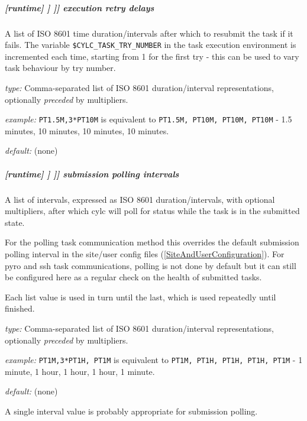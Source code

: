 \subparagraph[execution retry delays]{[runtime] \textrightarrow [[\_\_NAME\_\_]] \textrightarrow [[[job]]] \textrightarrow execution retry delays}
\label{RefRetries}

A list of ISO 8601 time duration/intervals after which to resubmit the task
if it fails. The variable \lstinline=$CYLC_TASK_TRY_NUMBER= in the task
execution environment is incremented each time, starting from 1 for the
first try - this can be used to vary task behaviour by try number.

\begin{myitemize}
    \item {\em type:} Comma-separated list of ISO 8601 duration/interval representations,
    optionally {\em preceded} by multipliers.
    \item {\em example:} \lstinline=PT1.5M,3*PT10M= is equivalent to
    \lstinline=PT1.5M, PT10M, PT10M, PT10M= - 1.5 minutes, 10 minutes,
    10 minutes, 10 minutes.
    \item {\em default:} (none)
\end{myitemize}

\subparagraph[submission polling intervals]{[runtime] \textrightarrow [[\_\_NAME\_\_]] \textrightarrow [[[job]]] \textrightarrow submission polling intervals}
\label{SubmissionPollingIntervals}

A list of intervals, expressed as ISO 8601 duration/intervals, with optional
multipliers, after which cylc will poll for status while the task is in the
submitted state.

For the polling task communication method this overrides the default
submission polling interval in the site/user config files
(\ref{SiteAndUserConfiguration}). For pyro and ssh task communications,
polling is not done by default but it can still be configured here as a
regular check on the health of submitted tasks.

Each list value is used in turn until the last, which is used repeatedly
until finished.

\begin{myitemize}
    \item {\em type:} Comma-separated list of ISO 8601 duration/interval
        representations, optionally {\em preceded} by multipliers.
    \item {\em example:} \lstinline=PT1M,3*PT1H, PT1M= is equivalent to
    \lstinline=PT1M, PT1H, PT1H, PT1H, PT1M= - 1 minute, 1 hour, 1 hour, 1
    hour, 1 minute.
    \item {\em default:} (none)
\end{myitemize}
A single interval value is probably appropriate for submission polling.

